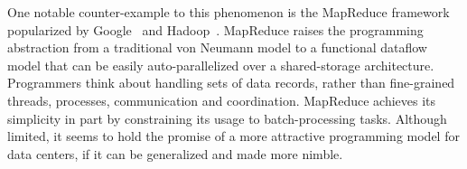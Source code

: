 \documentclass{sig-alternate}
\begin{document}
One notable counter-example to this phenomenon is the MapReduce framework popularized by Google~\cite{mapreduce} and Hadoop~\cite{hadoop}.  MapReduce raises the programming abstraction from a traditional von Neumann model to a functional dataflow model that can be easily auto-parallelized over a shared-storage architecture.   Programmers think about handling sets of data records, rather than fine-grained threads, processes, communication and coordination.  
MapReduce achieves its simplicity in part by constraining its usage to batch-processing tasks.  Although limited, it seems to hold the promise of a more attractive programming model for data centers, if it can be generalized and made more nimble.
% 
% 
% 
% 
% 
\end{document}
